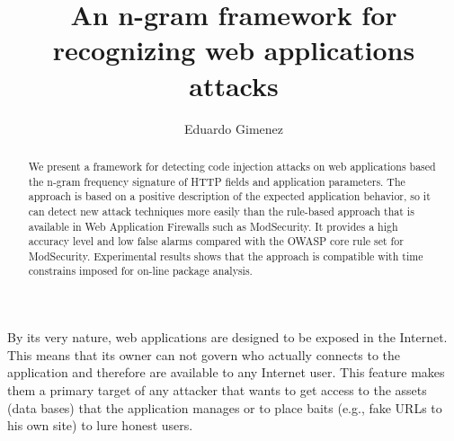 \documentclass[runningheads,a4paper]{llncs}
\begin{document}


\title{An n-gram framework for recognizing web applications attacks}

\author{Eduardo Gim\´enez}

%
\iffalse
\author{Firstname Lastname\inst{1} \and Firstname Lastname\inst{2} }

\institute{
Institute 1\\
\email{...}\and
Institute 2\\
\email{...}
}
\fi
			
\maketitle

\begin{abstract}
We present a framework for detecting code injection attacks on web
applications based the n-gram frequency signature of HTTP fields and application
parameters. The approach is based on a positive description of the
expected application behavior, so it can detect new attack techniques more
easily than the rule-based approach that is available in Web Application Firewalls such as
ModSecurity. It provides a high accuracy level and low false alarms compared
with the OWASP core rule set for ModSecurity. Experimental results shows
that the approach is compatible with time constrains imposed for on-line package
analysis.
\end{abstract}


By its very nature, web applications are designed to be exposed in the Internet. This means that its owner can not govern who actually connects to the application and  therefore are available to any Internet user. This feature makes them a primary target of any attacker that wants to get access to the assets (data bases) that the application manages or to place baits (e.g., fake URLs to his own site) to lure honest users.
\end{document}
